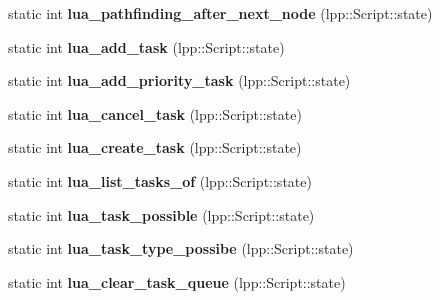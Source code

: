 \begin{DoxyCompactItemize}
\item 
static int {\bfseries lua\+\_\+pathfinding\+\_\+after\+\_\+next\+\_\+node} (lpp\+::\+Script\+::state)\hypertarget{class_lua_interface_aec484d92fe1ca1c3aeb67cdf9f32ed44}{}\label{class_lua_interface_aec484d92fe1ca1c3aeb67cdf9f32ed44}

\item 
static int {\bfseries lua\+\_\+add\+\_\+task} (lpp\+::\+Script\+::state)\hypertarget{class_lua_interface_af4c18565b133c05f84cdad0be3eb81ad}{}\label{class_lua_interface_af4c18565b133c05f84cdad0be3eb81ad}

\item 
static int {\bfseries lua\+\_\+add\+\_\+priority\+\_\+task} (lpp\+::\+Script\+::state)\hypertarget{class_lua_interface_a8a7bce346f98995326e1c29076799efe}{}\label{class_lua_interface_a8a7bce346f98995326e1c29076799efe}

\item 
static int {\bfseries lua\+\_\+cancel\+\_\+task} (lpp\+::\+Script\+::state)\hypertarget{class_lua_interface_a7d78dd61700d78e39eb95975bb3a0f9a}{}\label{class_lua_interface_a7d78dd61700d78e39eb95975bb3a0f9a}

\item 
static int {\bfseries lua\+\_\+create\+\_\+task} (lpp\+::\+Script\+::state)\hypertarget{class_lua_interface_a0391d2a2c8061fc1f8448e5f484b0492}{}\label{class_lua_interface_a0391d2a2c8061fc1f8448e5f484b0492}

\item 
static int {\bfseries lua\+\_\+list\+\_\+tasks\+\_\+of} (lpp\+::\+Script\+::state)\hypertarget{class_lua_interface_a90bfe30210dde8c841045d9de5b92f89}{}\label{class_lua_interface_a90bfe30210dde8c841045d9de5b92f89}

\item 
static int {\bfseries lua\+\_\+task\+\_\+possible} (lpp\+::\+Script\+::state)\hypertarget{class_lua_interface_a280f732152edaf3a0f4940888443a375}{}\label{class_lua_interface_a280f732152edaf3a0f4940888443a375}

\item 
static int {\bfseries lua\+\_\+task\+\_\+type\+\_\+possibe} (lpp\+::\+Script\+::state)\hypertarget{class_lua_interface_a5356e669d2b94156b955bc7a17b734e6}{}\label{class_lua_interface_a5356e669d2b94156b955bc7a17b734e6}

\item 
static int {\bfseries lua\+\_\+clear\+\_\+task\+\_\+queue} (lpp\+::\+Script\+::state)\hypertarget{class_lua_interface_a97f82727ebaee2f68634a404714b8c78}{}\label{class_lua_interface_a97f82727ebaee2f68634a404714b8c78}


\end{DoxyCompactItemize}
